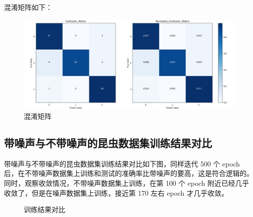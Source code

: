 \documentclass[12pt]{article}
\begin{document}
	混淆矩阵如下：
	
	\begin{figure}[H]
		\centering
		\includegraphics[width=5.7in]{./images/insects_noise_confusion.png}
		\centering
		\caption{混淆矩阵}
	\end{figure}
	
	\subsection{带噪声与不带噪声的昆虫数据集训练结果对比}
	
	带噪声与不带噪声的昆虫数据集训练结果对比如下图，同样迭代 500 个 epoch 后，在不带噪声数据集上训练和测试的准确率比带噪声的要高，这是符合逻辑的。同时，观察收敛情况，不带噪声数据集上训练，在第 100 个 epoch 附近已经几乎收敛了，但是在噪声数据集上训练，接近第 170 左右 epoch 才几乎收敛。
	
	\begin{figure}[H]
		\centering
		
		\centering
		\caption{训练结果对比}
	\end{figure}
	
\end{document}
